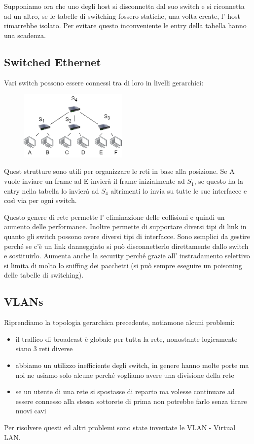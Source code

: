 Supponiamo ora che uno degli host si disconnetta dal suo switch e si riconnetta ad un altro, se le tabelle di switching fossero statiche, una volta create, l' host rimarrebbe isolato.
Per evitare questo inconveniente le entry della tabella hanno una scadenza.


\subsection{Switched Ethernet}
Vari switch possono essere connessi tra di loro in livelli gerarchici:
\begin{figure}[H]
    \centering
    \includegraphics[width=200px]{images/4_Switched_Networks/layered_switch.png}
\end{figure}
Quest strutture sono utili per organizzare le reti in base alla posizione.
Se A vuole inviare un frame ad E invierà il frame inizialmente ad $S_1$, se questo ha la entry nella tabella lo invierà ad $S_4$ altrimenti lo invia su tutte le sue interfacce e così via per ogni switch.

Questo genere di rete permette l' eliminazione delle collisioni e quindi un aumento delle performance.
Inoltre permette di supportare diversi tipi di link in quanto gli switch possono avere diversi tipi di interfacce.
Sono semplici da gestire perché se c'è un link danneggiato si può disconnetterlo direttamente dallo switch e sostituirlo.
Aumenta anche la security perché grazie all' instradamento selettivo si limita di molto lo sniffing dei pacchetti (si può sempre eseguire un poisoning delle tabelle di switching).


\subsection{VLANs}
Riprendiamo la topologia gerarchica precedente, notiamone alcuni problemi:
\begin{itemize}
    \item il traffico di broadcast è globale per tutta la rete, nonostante logicamente siano 3 reti diverse
    \item abbiamo un utilizzo inefficiente degli switch, in genere hanno molte porte ma noi ne usiamo solo alcune perché vogliamo avere una divisione della rete
    \item se un utente di una rete si spostasse di reparto ma volesse continuare ad essere connesso alla stessa sottorete di prima non potrebbe farlo senza tirare nuovi cavi
\end{itemize}
Per risolvere questi ed altri problemi sono state inventate le VLAN - Virtual LAN.

